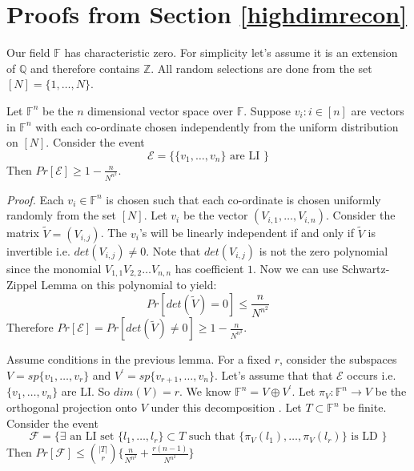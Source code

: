\documentclass[letterpaper,USenglish,numberwithinsect]{lipics}
\newcommand{\F}{\mathbb{F}}
\newcommand{\Q}{\mathbb{Q}}
\newcommand{\ME}{\mathcal{E}}
\newcommand{\Z}{\mathbb{Z}}
\begin{document}
\section{Proofs from Section \ref{highdimrecon}}
Our field $\F$ has characteristic zero. For simplicity let's assume it is an extension of $\Q$ and therefore contains $\Z$.
All random selections are done from the set $[N]=\{1,\ldots, N\}$.
\begin{lemma}\label{linindrandom}
Let $\F^n$ be the $n$ dimensional vector space over $\F$. Suppose $v_i :
i\in [n]$ are vectors in $\F^n$ with each co-ordinate chosen independently from the
uniform distribution on $[N]$. Consider the event
\[
 \ME = \{\{v_1,\ldots,v_n\} \text{ are LI }\}
\]
Then $Pr[\ME]\geq 1-\frac{n}{N^{n^2}}$.
\end{lemma}
\emph{Proof.}
Each $v_i\in \F^n$ is chosen such that each co-ordinate is chosen uniformly
randomly from the set $[N]$.
Let $v_i$ be the vector $(V_{i,1},\ldots,V_{i,n})$. Consider the matrix
$\tilde V = (V_{i,j})$. The $v_i$'s will be linearly
independent if and only if $\tilde V$ is invertible i.e. $det(V_{i,j})\neq 0$. Note that
$det(V_{i,j})$ is not the zero polynomial since the monomial $V_{1,1}V_{2,2}\ldots V_{n,n}$
has coefficient $1$. Now we can use Schwartz-Zippel Lemma \cite{Sax09} on this
polynomial to yield:
  \[
   Pr[det(\tilde V)=0]
\leq \frac{n}{N^{n^2}}
  \]
  Therefore $ Pr[\ME] = Pr[det(\tilde V)\neq 0] \geq
1-\frac{n}{N^{n^2}}$.


\begin{lemma}\label{linindproj}
Assume conditions in the previous lemma. For a fixed $r$, consider the subspaces $V = sp\{v_1,\ldots,v_r\}$
and $V^\prime = sp\{v_{r+1},\ldots,v_n\}$. Let's assume that that $\ME$ occurs i.e. $\{v_1,\ldots,v_n\}$ are LI. So $dim(V)=r$.
We know $\F^n = V\oplus V^\prime$.  Let $\pi_{V} : \F^n \rightarrow V$ be the
orthogonal projection onto $V$ under this decomposition . Let $T \subset \F^n$ be finite. Consider the event
\[
 \mathcal{F} = \{\exists \text{ an LI set } \{l_1,\ldots,l_r\}\subset T \text{ such that } \{\pi_V(l_1),\ldots,\pi_V(l_r)\} \text{ is LD }\}
\]
Then $Pr[\mathcal{F}]\leq {|T|\choose r}\{\frac{n}{N^{n^2}} + \frac{r(n-1)}{N^{n^2}}\}$

\end{lemma}
\end{document}
